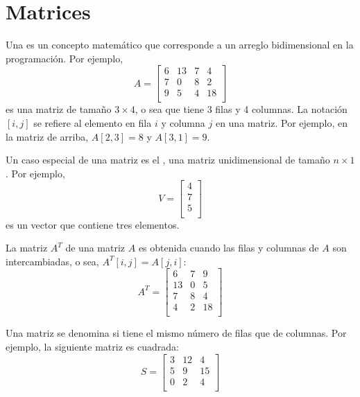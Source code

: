 \chapter{Matrices}


Una  es un concepto matemático que corresponde a un arreglo
bidimensional en la programación. Por ejemplo,
\[
    A =
    \begin{bmatrix}
        6 & 13 & 7 & 4  \\
        7 & 0  & 8 & 2  \\
        9 & 5  & 4 & 18 \\
    \end{bmatrix}
\]
es una matriz de tamaño $3 \times 4$, o sea que tiene 3 filas y 4 columnas.
La notación $[i,j]$ se refiere al elemento en fila $i$ y columna $j$ en una
matriz. Por ejemplo, en la matriz de arriba, $A[2,3]=8$ y $A[3,1]=9$.

Un caso especial de una matriz es el , una matriz
unidimensional de tamaño $n \times 1$. Por ejemplo,
\[
    V =
    \begin{bmatrix}
        4 \\
        7 \\
        5 \\
    \end{bmatrix}
\]
es un vector que contiene tres elementos.


La matriz  $A^T$ de una matriz $A$ es obtenida cuando
las filas y columnas de $A$ son intercambiadas, o sea, $A^T[i,j]=A[j,i]$:
\[
    A^T =
    \begin{bmatrix}
        6  & 7 & 9  \\
        13 & 0 & 5  \\
        7  & 8 & 4  \\
        4  & 2 & 18 \\
    \end{bmatrix}
\]

Una matriz se denomina  si tiene el mismo número de filas
que de columnas. Por ejemplo, la siguiente matriz es cuadrada:
\[
    S =
    \begin{bmatrix}
        3 & 12 & 4  \\
        5 & 9  & 15 \\
        0 & 2  & 4  \\
    \end{bmatrix}
\]

